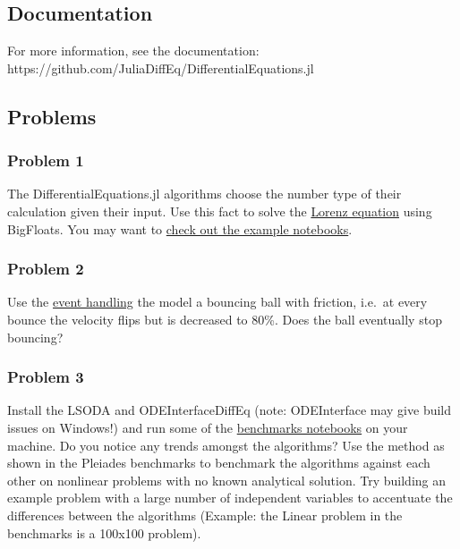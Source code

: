 \documentclass[11pt]{article}
\begin{document}
    \subsection{Documentation}\label{documentation}

For more information, see the documentation:
https://github.com/JuliaDiffEq/DifferentialEquations.jl

    \subsection{Problems}\label{problems}

\subsubsection{Problem 1}\label{problem-1}

The DifferentialEquations.jl algorithms choose the number type of their
calculation given their input. Use this fact to solve the
\href{https://en.wikipedia.org/wiki/Lorenz_system}{Lorenz equation}
using BigFloats. You may want to
\href{https://github.com/JuliaDiffEq/DiffEqTutorials.jl}{check out the
example notebooks}.

\subsubsection{Problem 2}\label{problem-2}

Use the
\href{http://docs.juliadiffeq.org/latest/features/callback_functions.html}{event
handling} the model a bouncing ball with friction, i.e.~at every bounce
the velocity flips but is decreased to 80\%. Does the ball eventually
stop bouncing?

\subsubsection{Problem 3}\label{problem-3}

Install the LSODA and ODEInterfaceDiffEq (note: ODEInterface may give
build issues on Windows!) and run some of the
\href{https://github.com/JuliaDiffEq/DiffEqBenchmarks.jl}{benchmarks
notebooks} on your machine. Do you notice any trends amongst the
algorithms? Use the method as shown in the Pleiades benchmarks to
benchmark the algorithms against each other on nonlinear problems with
no known analytical solution. Try building an example problem with a
large number of independent variables to accentuate the differences
between the algorithms (Example: the Linear problem in the benchmarks is
a 100x100 problem).


    
    
    
    
\end{document}
